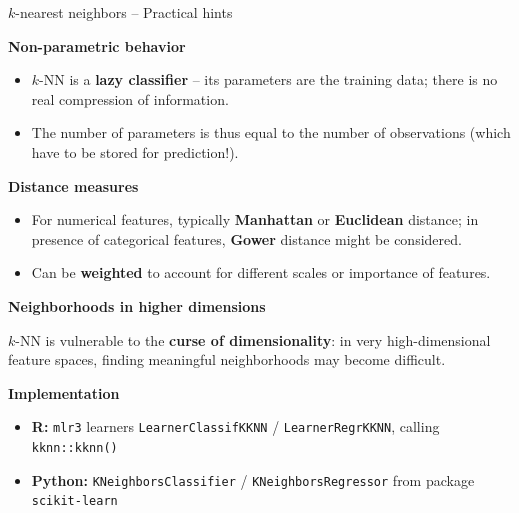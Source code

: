 \documentclass[11pt,compress,t,notes=noshow, xcolor=table]{beamer}
\newcommand{\highlight}[1]{\textcolor{highlightcol}{\textbf{#1}}}
\let\code=\texttt
\begin{document}
\begin{frame}{$k$-nearest neighbors -- Practical hints}

\footnotesize

\highlight{Non-parametric behavior}

\begin{itemize}
  \item $k$-NN is a \textbf{lazy classifier} -- its parameters are the training 
  data; there is no real compression of information.
  \item The number of parameters is thus equal to the number of observations
  (which have to be stored for prediction!).
\end{itemize}

\highlight{Distance measures}

\begin{itemize}
  \item For numerical features, typically \textbf{Manhattan} or 
  \textbf{Euclidean} distance; in presence of categorical features, 
  \textbf{Gower} distance might be considered.
  \item Can be \textbf{weighted} to account for different scales or
  importance of features.
\end{itemize}

\highlight{Neighborhoods in higher dimensions}

$k$-NN is vulnerable to the \textbf{curse of dimensionality}: in very
high-dimensional feature spaces, finding meaningful neighborhoods may become
difficult.

\medskip

\highlight{Implementation}
\begin{itemize}
  \item \textbf{R:} \code{mlr3} learners \code{LearnerClassifKKNN} /
  \code{LearnerRegrKKNN}, calling \code{kknn::kknn()}
  \item \textbf{Python:} \code{KNeighborsClassifier} / 
  \code{KNeighborsRegressor} from package \code{scikit-learn}
\end{itemize}

\end{frame}

\end{document}
